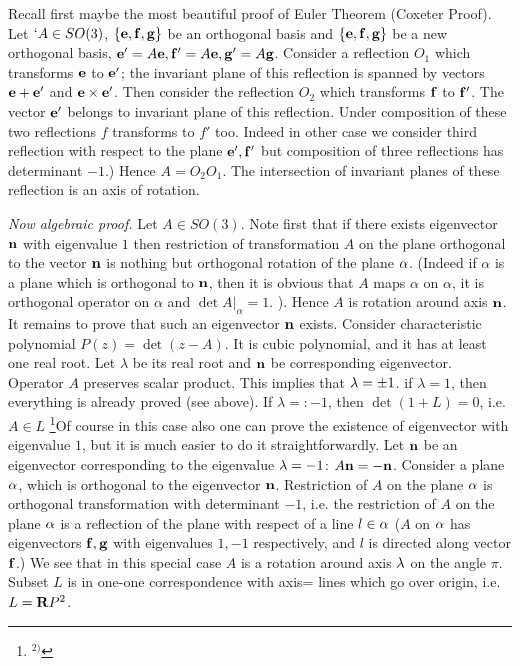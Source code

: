 Recall first maybe the most beautiful proof of Euler Theorem (Coxeter Proof).
Let $`A \in SO(3)$, $\{{\bf e},{\bf f},{\bf g}\}$ be an orthogonal basis 
and  $\{{\bf e},{\bf f},{\bf g}\}$ be a new orthogonal basis,
${\bf e}'=A{\bf e},{\bf f}'=A{\bf e}, {\bf g}'=A{\bf g} $.
Consider a reflection $O_1$ which transforms ${\bf e}$ to ${\bf e}'$; the
invariant plane of this reflection is spanned by vectors ${\bf e}+{\bf e}'$ and 
${\bf e}\times {\bf e}'$. Then consider 
the reflection $O_2$ which  transforms
${\bf f}$ to ${\bf f}'$. The vector ${\bf e}'$ belongs to invariant plane of this 
reflection. Under composition of these
two reflections $f$ transforms to $f'$ too. Indeed 
in other case we consider third reflection with respect to the
plane ${\bf e}',{\bf f}'$ but composition of three reflections has determinant $-1$.)
Hence $A=O_2O_1$. 
The intersection of invariant planes of these reflection is an axis
of rotation.\finish

{\it  Now algebraic proof.} Let $A\in SO(3)$.
Note first that if there exists eigenvector ${\bf n}$ 
with eigenvalue $1$ then restriction of transformation
$A$ on the plane orthogonal to the vector ${\bf n}$ is nothing 
but orthogonal rotation of the plane $\alpha$.
(Indeed if $\alpha$ is a plane which is orthogonal to
${\bf n}$, then it is obvious that $A$ maps $\alpha$ on $\alpha$,
it is orthogonal operator on $\alpha$ and $\det A\vert_\alpha=1$. ).  
Hence $A$ is rotation around axis ${\bf n}$. 
It remains to prove that such an  eigenvector ${\bf n}$ exists.
Consider characteristic polynomial
$P(z)=\det(z-A)$. It is cubic polynomial, and it has at least one 
real root. 
Let $\lambda$ be its real root and ${\bf n}$ be corresponding eigenvector.
Operator $A$ preserves scalar product. This implies that $\lambda=\pm 1$.
if $\lambda=1$, then everything is already proved (see above).
If $\lambda=:-1$, then $\det (1+L)=0$, i.e. $A\in L$
\footnote{$^{2)}$}{Of course in this case also one can prove the existence
of eigenvector with eigenvalue $1$, but it is much easier to do
it straightforwardly}. 
Let ${\bf n}$ be an eigenvector corresponding to the eigenvalue $\lambda=-1$: 
$A{\bf n}=-{\bf n}$. Consider a plane $\alpha$,
which is orthogonal to the eigenvector ${\bf n}$. 
Restriction of
$A$ on the plane $\alpha$ is orthogonal transformation with determinant $-1$,
i.e. the restriction of $A$ on the plane $\alpha$ is a reflection of the plane
with respect of a line $l\in\alpha$ ($A$ on $\alpha$ has eigenvectors  ${\bf f},{\bf g}$
with eigenvalues $1,-1$ respectively, and 
$l$ is directed along vector ${\bf f}$.) 
We see that in this special case $A$ is a rotation around axis $\lambda$
on the angle $\pi$. Subset $L$ is in one-one correspondence with
axis= lines which go over origin, i.e. $L={\bf R} P^2$.
\finish


\bye
